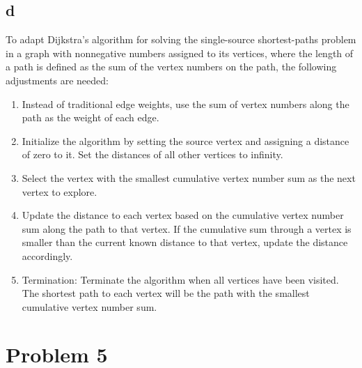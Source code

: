 \documentclass{article}
\begin{document}
\subsection*{d}
To adapt Dijkstra's algorithm for solving the single-source shortest-paths problem in a graph with nonnegative numbers assigned to its vertices, where the length of a path is defined as the sum of the vertex numbers on the path, the following adjustments are needed:
\begin{enumerate}
    \item Instead of traditional edge weights, use the sum of vertex numbers along the path as the weight of each edge.
    \item Initialize the algorithm by setting the source vertex and assigning a distance of zero to it. Set the distances of all other vertices to infinity.
    \item Select the vertex with the smallest cumulative vertex number sum as the next vertex to explore.
    \item Update the distance to each vertex based on the cumulative vertex number sum along the path to that vertex. If the cumulative sum through a vertex is smaller than the current known distance to that vertex, update the distance accordingly.
    \item Termination: Terminate the algorithm when all vertices have been visited. The shortest path to each vertex will be the path with the smallest cumulative vertex number sum.
\end{enumerate}
\newpage
\section*{Problem 5}
\end{document}
